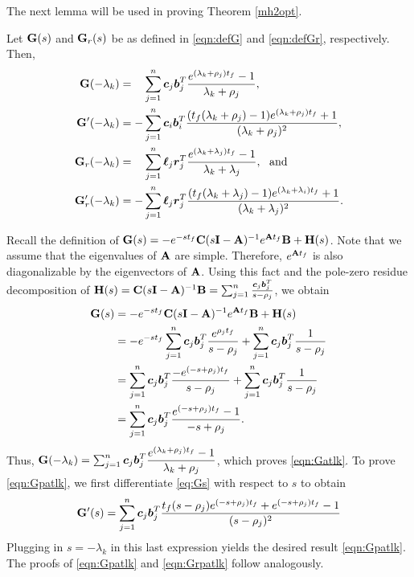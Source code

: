 \documentclass[twocolumn]{autart}
\begin{document}
The next lemma will be used in proving Theorem \ref{mh2opt}.
\begin{Lemma}\label{mgexp}
Let $\mathbf{G}(s)$ and $\mathbf{G}_r(s)$ be as defined in \eqref{eqn:defG} and \eqref{eqn:defGr}, respectively. Then,
\begin{align}
\mathbf{G}(-\lambda_k)&=\phantom{-}\sum_{j=1}^n\boldsymbol{c}_j\boldsymbol{b}_j^T\dfrac{e^{(\lambda_k+\rho_j){t_f}}-1}{\lambda_k+\rho_j},
\label{eqn:Gatlk}\\
 \mathbf{G}'(-\lambda_k)& =-\sum_{j=1}^n\boldsymbol{c}_i\boldsymbol{b}_i^T\dfrac {({t_f} (\lambda_k+\rho_j)-1)e^{(\lambda_k+\rho_j){t_f}}+1}{(\lambda_k+\rho_j)^2}, \label{eqn:Gpatlk}  \\
 \mathbf{G}_r(-\lambda_k)&=\phantom{-}\sum_{j=1}^n\boldsymbol{\ell}_j\boldsymbol{r}_j^T\dfrac{e^{(\lambda_k+\lambda_j){t_f}}-1}{\lambda_k+\lambda_j}, ~~\mbox{and} 
\label{eqn:Gratlk}\\
 \mathbf{G}_r'(-\lambda_k)& =-\sum_{j=1}^n\boldsymbol{\ell}_j\boldsymbol{r}_j^T\dfrac {({t_f} (\lambda_k+\lambda_j)-1)e^{(\lambda_k+\lambda_i){t_f}}+1}{(\lambda_k+\lambda_j)^2}. \label{eqn:Grpatlk} 
\end{align}
\end{Lemma}
\begin{pf}
Recall the definition of $\mathbf{G}(s) = -e^{-st_f}\mathbf{C}(s\mathbf{I}-\mathbf{A})^{-1}e^{\mathbf{A} t_f}\mathbf{B}+\mathbf{H}(s)$. Note that we assume that the eigenvalues of $\mathbf{A}$ are simple. Therefore, $e^{\mathbf{A} t_f}$ is also diagonalizable by the eigenvectors of $\mathbf{A}$. Using this fact and the pole-zero residue decomposition of   $\mathbf{H}(s) = \mathbf{C}(s\mathbf{I}-\mathbf{A})^{-1} \mathbf{B} = \sum_{j=1}^n \frac{\boldsymbol{c}_j \boldsymbol{b}_j^T}{s-\rho_j}$, we obtain 
\begin{align}
\mathbf{G}(s) &= -e^{-st_f}\mathbf{C}(s\mathbf{I}-\mathbf{A})^{-1}e^{\mathbf{A} t_f}\mathbf{B}+\mathbf{H}(s)  \nonumber \\ 
&=-e^{-s{t_f}}\sum_{j=1}^n\boldsymbol{c}_j\boldsymbol{b}_j^T\dfrac{e^{\rho_jt_f}}{s-\rho_j}+\sum_{j=1}^n\boldsymbol{c}_j\boldsymbol{b}_j^T\dfrac{1}{s-\rho_j}\\
&=\sum_{j=1}^n\boldsymbol{c}_j\boldsymbol{b}_j^T\dfrac{-e^{(-s + \rho_j){t_f}}}{s-\rho_j}+\sum_{j=1}^n\boldsymbol{c}_j\boldsymbol{b}_j^T\dfrac{1}{s-\rho_j} \nonumber\\
&=\sum_{j=1}^n\boldsymbol{c}_j\boldsymbol{b}_j^T\dfrac{e^{(-s+\rho_j)t_f}-1}{-s+\rho_j}. \label{eq:Gs}
\end{align}
Thus,
$\mathbf{G}(-\lambda_k)=\sum_{j=1}^n\boldsymbol{c}_j\boldsymbol{b}_j^T\dfrac{e^{(\lambda_k+\rho_j){t_f}}-1}{\lambda_k+\rho_j}$,
which proves \eqref{eqn:Gatlk}. To prove \eqref{eqn:Gpatlk}, we first differentiate \eqref{eq:Gs} with respect to $s$ to obtain
 \begin{align*}
 \mathbf{G}'(s) =\sum_{j=1}^n\boldsymbol{c}_j\boldsymbol{b}_j^T\dfrac {{t_f} (s-\rho_j)e^{(-s+\rho_j){t_f}}+e^{(-s+\rho_j){t_f}}-1}{(s-\rho_j)^2}
 \end{align*}
 Plugging in $s= -\lambda_k$ in this last expression yields the desired result \eqref{eqn:Gpatlk}. The proofs of
 \eqref{eqn:Gpatlk} and \eqref{eqn:Grpatlk} follow analogously. 
\end{pf}%
\end{document}

